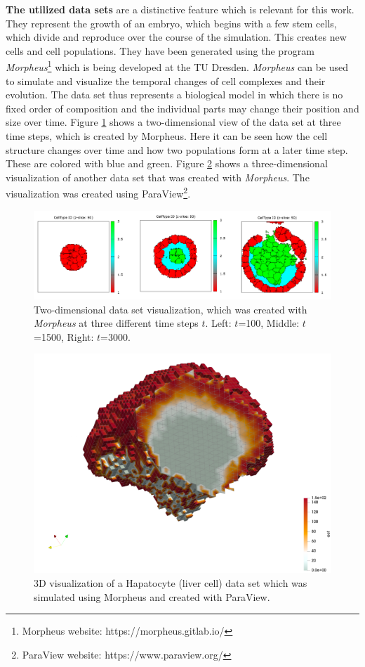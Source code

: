 \textbf{The utilized data sets} are a distinctive feature which is relevant for this work.
They represent the growth of an embryo, which begins with a few stem cells, which divide and reproduce over the course of the simulation. This creates new cells and cell populations.
They have been generated using the program \emph{Morpheus}\footnote{Morpheus website: https://morpheus.gitlab.io/} which is being developed at the TU Dresden.\cite{morpheus_2022}
\emph{Morpheus} can be used to simulate and visualize the temporal changes of cell complexes and their evolution. 
The data set thus represents a biological model in which there is no fixed order of composition and the individual parts may change their position and size over time.  
Figure \ref{fig:Dataset2D} shows a two-dimensional view of the data set at three time steps, which is created by Morpheus. Here it can be seen how the cell structure changes over time and how two populations form at a later time step. These are colored with blue and green. 
Figure \ref{fig:Dataset3D} shows a three-dimensional visualization of another data set that was created with \emph{Morpheus}. The visualization was created using ParaView\footnote{ParaView website: https://www.paraview.org/}.
\begin{figure}[h]
	\centering
	\includegraphics[width=1\linewidth]{fig/Images/Dataset2D}
	\caption[]{Two-dimensional data set visualization, which was created with \emph{Morpheus} at three different time steps $t$. Left: $t$=100, Middle: $t$=1500, Right: $t$=3000.}
	\label{fig:Dataset2D}
\end{figure}

\begin{figure}[h]
	\centering
	\includegraphics[width=0.7\linewidth]{fig/Images/Dataset3D}
	\caption[]{3D visualization of a Hapatocyte (liver cell) data set which was simulated using Morpheus and created with ParaView.}
	\label{fig:Dataset3D}
\end{figure}
